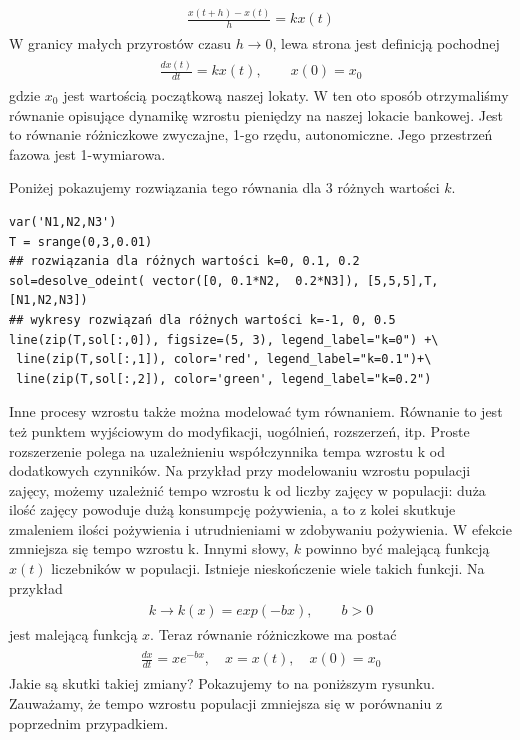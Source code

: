 \documentclass[a4paper,12pt,polish]{sphinxmanual}
\begin{document}
\label{ch1/chI011:equation-eqn24}\begin{gather}
\begin{split}\frac{x(t+h) - x(t)}{h} = k  x(t)\end{split}\label{ch1/chI011-eqn24}
\end{gather}
W granicy małych przyrostów czasu $h \to 0$, lewa strona jest definicją pochodnej
\label{ch1/chI011:equation-eqn25}\begin{gather}
\begin{split}\frac{dx(t)}{dt} =  k x(t), \quad \quad x(0) = x_0\end{split}\label{ch1/chI011-eqn25}
\end{gather}
gdzie $x_0$ jest wartością początkową naszej lokaty. W ten oto sposób otrzymaliśmy równanie opisujące dynamikę wzrostu pieniędzy na naszej lokacie bankowej. Jest to równanie różniczkowe zwyczajne, 1-go rzędu, autonomiczne. Jego przestrzeń fazowa jest 1-wymiarowa.

Poniżej pokazujemy  rozwiązania tego równania dla 3 różnych wartości $k$.


\begin{verbatim}
var('N1,N2,N3')
T = srange(0,3,0.01)
## rozwiązania dla różnych wartości k=0, 0.1, 0.2
sol=desolve_odeint( vector([0, 0.1*N2,  0.2*N3]), [5,5,5],T,[N1,N2,N3])
## wykresy rozwiązań dla różnych wartości k=-1, 0, 0.5
line(zip(T,sol[:,0]), figsize=(5, 3), legend_label="k=0") +\
 line(zip(T,sol[:,1]), color='red', legend_label="k=0.1")+\
 line(zip(T,sol[:,2]), color='green', legend_label="k=0.2")
\end{verbatim}


Inne procesy wzrostu także można modelować tym równaniem. Równanie to jest też punktem wyjściowym do modyfikacji, uogólnień, rozszerzeń, itp.  Proste rozszerzenie polega na uzależnieniu współczynnika tempa wzrostu k od dodatkowych czynników. Na przykład przy modelowaniu wzrostu populacji zajęcy, możemy uzależnić tempo wzrostu k od liczby zajęcy  w populacji: duża ilość zajęcy powoduje dużą konsumpcję pożywienia, a to z kolei skutkuje zmaleniem ilości pożywienia i utrudnieniami w zdobywaniu pożywienia. W efekcie zmniejsza się tempo wzrostu k. Innymi słowy, $k$ powinno być malejącą funkcją $x(t)$ liczebników w populacji.  Istnieje nieskończenie wiele takich funkcji.  Na przykład
\label{ch1/chI011:equation-eqn26}\begin{gather}
\begin{split}k  \to  k(x) = exp(-b x), \quad \quad b>0\end{split}\label{ch1/chI011-eqn26}
\end{gather}
jest malejącą funkcją $x$. Teraz równanie różniczkowe ma postać
\label{ch1/chI011:equation-eqn27}\begin{gather}
\begin{split}\frac{dx}{dt} = x e^{-bx}, \quad x = x(t), \quad x(0) = x_0\end{split}\label{ch1/chI011-eqn27}
\end{gather}
Jakie są skutki takiej zmiany? Pokazujemy to na poniższym rysunku. Zauważamy, że tempo wzrostu populacji zmniejsza się w porównaniu z poprzednim przypadkiem.
\end{document}
